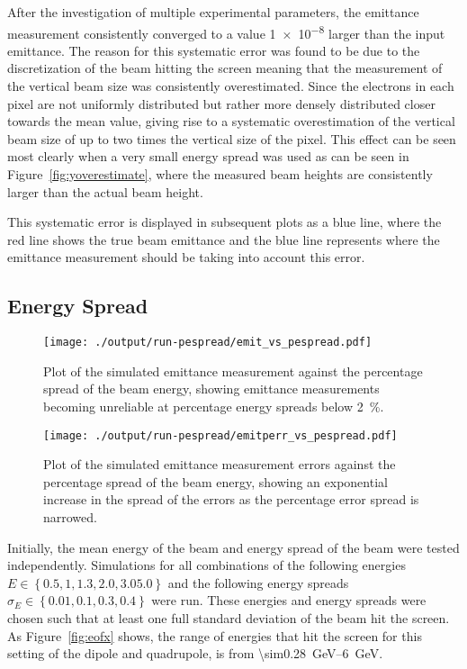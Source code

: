 After the investigation of multiple experimental parameters, the emittance
measurement consistently converged to a value \num{1e-8} larger than the input
emittance. The reason for this systematic error was found to be due to the
discretization of the beam hitting the screen meaning that the measurement of
the vertical beam size was consistently overestimated. Since the electrons in
each pixel are not uniformly distributed but rather more densely distributed
closer towards the mean value, giving rise to a systematic overestimation of the
vertical beam size of up to two times the vertical size of the pixel. This
effect can be seen most clearly when a very small energy spread was used as can
be seen in Figure~\ref{fig:yoverestimate}, where the measured beam heights are
consistently larger than the actual beam height.

This systematic error is displayed in subsequent plots as a blue line, where the
red line shows the true beam emittance and the blue line represents where the
emittance measurement should be taking into account this error.

\subsection{Energy Spread}

\begin{figure*}%
	\begin{minipage}[t]{\columnwidth}
		\centering
		\texttt{[image: ./output/run-pespread/emit\_vs\_pespread.pdf]}
		\caption{
			Plot of the simulated emittance measurement against the percentage
			spread of the beam energy, showing emittance measurements becoming
			unreliable at percentage energy spreads below \SI{2}{\percent}.
		}
		\label{fig:emit_pespread}
	\end{minipage}\hfill
	\begin{minipage}[t]{\columnwidth}
		\centering
		\texttt{[image: ./output/run-pespread/emitperr\_vs\_pespread.pdf]}
		\caption{
			Plot of the simulated emittance measurement errors against the
			percentage spread of the beam energy, showing an exponential increase in
			the spread of the errors as the percentage error spread is narrowed.
		}
		\label{fig:emitperr_pespread}
	\end{minipage}
\end{figure*}

Initially, the mean energy of the beam and energy spread of the beam were tested
independently. Simulations for all combinations of the following energies \(E
\in \left\{ 0.5, 1, 1.3, 2.0, 3.0 5.0\right\} \) and the following energy
spreads \(\sigma_E \in \left\{ 0.01, 0.1, 0.3, 0.4 \right\}\) were run.  These
energies and energy spreads were chosen such that at least one full standard
deviation of the beam hit the screen. As Figure~\ref{fig:eofx} shows, the range
of energies that hit the screen for this setting of the dipole and quadrupole,
is from \SIrange{\sim0.28}{6}{\giga\electronvolt}.

